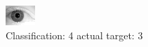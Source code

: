 \begin{figure}[h!]
\begin{center}
\includegraphics[width=0.60\columnwidth]{figures/ID2161_class_4_target_3.png}
\end{center}
\caption{ Classification: 4 actual target: 3}
\label{fig:ID2161_class_4_target_3}
\end{figure}
